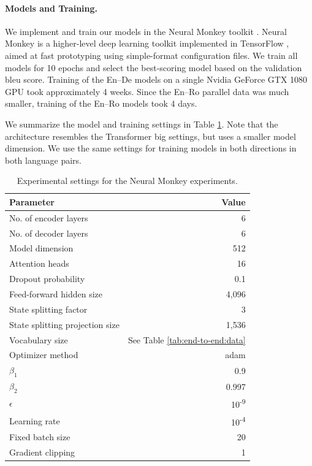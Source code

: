 \paragraph{Models and Training.}
We implement and train our models in the Neural Monkey toolkit
\citep{helcl-libovicky-2017-neural,helcl-etal-2018-neural}. Neural Monkey is a
higher-level deep learning toolkit implemented in TensorFlow
\citep{tensorflow2015-whitepaper}, aimed at fast prototyping using
simple-format configuration files. We train all models for 10 epochs and select
the best-scoring model based on the validation \acs{bleu} score. Training of
the En--De models on a single Nvidia GeForce GTX 1080 GPU took approximately 4
weeks. Since the En--Ro parallel data was much smaller, training of the En--Ro
models took 4 days.

We summarize the model and training settings in Table
\ref{tab:end-to-end:hparams}. Note that the architecture resembles the
Transformer big settings, but uses a smaller model dimension. We use the same
settings for training models in both directions in both language pairs.

\begin{table}
  \centering
  \begin{tabular}{lr}
    \toprule
    Parameter & Value \\
    \midrule
    No. of encoder layers & 6 \\
    No. of decoder layers & 6 \\
    Model dimension & 512 \\
    Attention heads & 16 \\
    Dropout probability & 0.1 \\
    Feed-forward hidden size & 4,096 \\
    State splitting factor & 3 \\
    State splitting projection size & 1,536 \\
    Vocabulary size & See Table \ref{tab:end-to-end:data} \\
    \midrule
    Optimizer method & adam \\
    $\beta_1$ & 0.9 \\
    $\beta_2$ & 0.997 \\
    $\epsilon$ & 10\textsuperscript{-9} \\
    Learning rate & 10\textsuperscript{-4} \\
    Fixed batch size & 20 \\
    Gradient clipping & 1 \\
    \bottomrule
  \end{tabular}

  \caption{Experimental settings for the Neural Monkey experiments.}%
  \label{tab:end-to-end:hparams}
\end{table}



